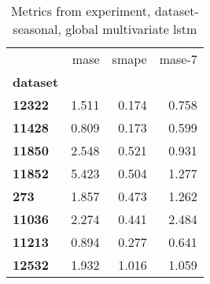\begin{table}[h]
\centering
\caption{Metrics from experiment, dataset-seasonal, global multivariate lstm}
\label{table:global-multivariate-lstm-dataset-seasonal}
\begin{tabular}{lrrr}
\toprule
{} &   mase &  smape &  mase-7 \\
\textbf{dataset} &        &        &         \\
\midrule
\textbf{12322  } &  1.511 &  0.174 &   0.758 \\
\textbf{11428  } &  0.809 &  0.173 &   0.599 \\
\textbf{11850  } &  2.548 &  0.521 &   0.931 \\
\textbf{11852  } &  5.423 &  0.504 &   1.277 \\
\textbf{273    } &  1.857 &  0.473 &   1.262 \\
\textbf{11036  } &  2.274 &  0.441 &   2.484 \\
\textbf{11213  } &  0.894 &  0.277 &   0.641 \\
\textbf{12532  } &  1.932 &  1.016 &   1.059 \\
\bottomrule
\end{tabular}
\end{table}
